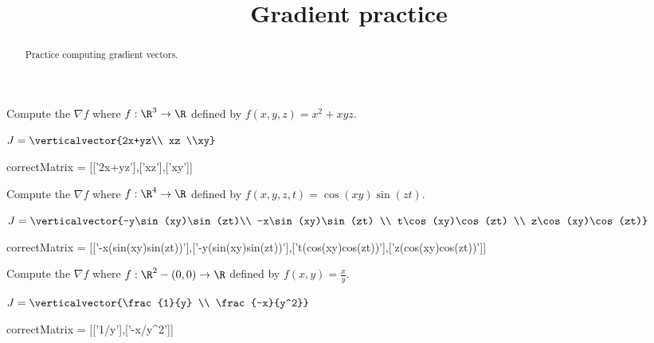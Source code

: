 \documentclass{ximera}
\title{Gradient practice}
\begin{document}
	\begin{abstract}
		Practice computing gradient vectors.
	\end{abstract}
	
	\begin{question}	
		Compute the $\nabla f$ where $f:\R^3 \to \R$ defined by $f(x,y,z) = x^2+xyz$.
		\begin{solution}
		\begin{hint}
			\(J = \verticalvector{2x+yz\\ xz \\xy}\)
		\end{hint}
		\begin{matrix-answer}[name=J]
			correctMatrix  = [['2x+yz'],['xz'],['xy']]
		\end{matrix-answer}
		\end{solution}
	\end{question}
	
	\begin{question}	
		Compute the $\nabla f$ where $f:\R^4 \to \R$ defined by $f(x,y,z,t) = \cos(xy)\sin(zt)$.
		\begin{solution}
		\begin{hint}
			\(J = \verticalvector{-y\sin(xy)\sin(zt)\\ -x\sin(xy)\sin(zt) \\ t\cos(xy)\cos(zt) \\ z\cos(xy)\cos(zt)}\)
		\end{hint}
		\begin{matrix-answer}[name=J]
			correctMatrix  = [['-x(sin(xy)sin(zt))'],['-y(sin(xy)sin(zt))'],['t(cos(xy)cos(zt))'],['z(cos(xy)cos(zt))']]
		\end{matrix-answer}
		\end{solution}
	\end{question}
	
	\begin{question}	
		Compute the $\nabla f$ where $f:\R^2-{(0,0)} \to \R$ defined by $f(x,y) = \frac{x}{y}$.
		\begin{solution}
		\begin{hint}
			\(J = \verticalvector{\frac{1}{y} \\ \frac{-x}{y^2}}\)
		\end{hint}
		\begin{matrix-answer}[name=J]
			correctMatrix  = [['1/y'],['-x/y^2']]
		\end{matrix-answer}
		\end{solution}
	\end{question}

	
\end{document}
